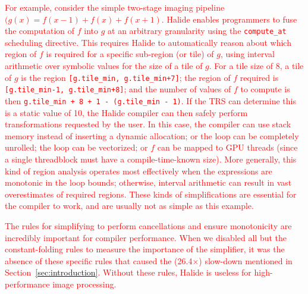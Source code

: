 \documentclass[acmsmall,review]{acmart}\settopmatter{printfolios=true,printccs=false,printacmref=false}
\newcommand{\modified}[1]{\textcolor{red}{{#1}}}
\newcommand{\hmax}[0]{\texttt{max}}
\newcommand{\hmin}[0]{\texttt{min}}
\begin{document}
\modified{For example, consider the simple two-stage imaging pipeline $(g(x) = f(x - 1) + f(x) + f(x + 1)$.
  Halide enables programmers to fuse the computation of $f$ into $g$ at an arbitrary granularity
  using the \texttt{compute\_at} scheduling directive.  This requires Halide to automatically reason
  about which region of $f$ is required for a specific sub-region (or tile) of $g$, using interval
  arithmetic over symbolic values for the size of a tile of $g$.  For a tile size of 8, a tile of $g$
  is the region \texttt{[g.tile\_min, g.tile\_min+7]};  the region of $f$ required is
  \texttt{[g.tile\_min-1, g.tile\_min+8]}; and the number of values of $f$ to compute is then
  \texttt{g.tile\_min + 8 + 1 - (g.tile\_min - 1)}.  If the TRS can determine this is a static value
  of 10, the Halide compiler can then safely perform transformations requested by the user.  In this
  case, the compiler can use stack memory instead of inserting a dynamic allocation; or the loop can be
  completely unrolled; the loop can be vectorized; or $f$ can be mapped to GPU threads (since a single
  threadblock must have a compile-time-known size).  More generally, this kind of region analysis
  operates most effectively when the expressions are monotonic in the loop bounds; otherwise, interval
  arithmetic can result in vast overestimates of required regions.  These kinds of simplifications are essential
  for the compiler to work, and are usually not as simple as this example.}

\modified{The rules for simplifying to perform cancellations and
  ensure monotonicity are incredibly important for compiler
  performance. When we disabled all but the constant-folding rules to
  measure the importance of the simplifier, it was the absence of
  these specific rules that caused the (26.4$\times$) slow-down
  mentioned in Section~\ref{sec:introduction}. Without these rules,
  Halide is useless for high-performance image
  processing.}

\end{document}

